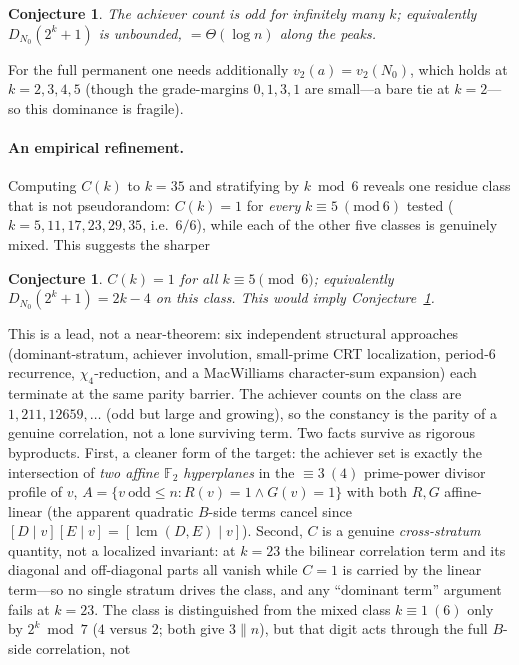 \documentclass[11pt]{article}
\newtheorem{conjecture}[theorem]{Conjecture}
\theoremstyle{remark}\newtheorem{remark}[theorem]{Remark}
\begin{document}
\begin{conjecture}\label{conj:io}
The achiever count is odd for infinitely many $k$; equivalently $D_{N_0}(2^k+1)$ is unbounded,
$=\Theta(\log n)$ along the peaks.
\end{conjecture}
For the full permanent one needs additionally $v_2(a)=v_2(N_0)$, which holds at $k=2,3,4,5$ (though the
grade-margins $0,1,3,1$ are small---a bare tie at $k=2$---so this dominance is fragile).

\paragraph{An empirical refinement.} Computing $C(k)$ to $k=35$ and stratifying by $k\bmod 6$ reveals
one residue class that is not pseudorandom: $C(k)=1$ for \emph{every} $k\equiv5\ (\mathrm{mod}\ 6)$
tested ($k=5,11,17,23,29,35$, i.e.\ $6/6$), while each of the other five classes is genuinely mixed.
This suggests the sharper
\begin{conjecture}\label{conj:mod6}
$C(k)=1$ for all $k\equiv5\pmod6$; equivalently $D_{N_0}(2^k+1)=2k-4$ on this class. This would imply
Conjecture~\ref{conj:io}.
\end{conjecture}
\noindent This is a lead, not a near-theorem: six independent structural approaches (dominant-stratum, achiever involution, small-prime CRT localization,
period-$6$ recurrence, $\chi_4$-reduction, and a MacWilliams \cite{MS} character-sum expansion) each terminate at the same parity barrier.
The achiever counts on the class are $1,211,12659,\dots$ (odd but large and growing), so the
constancy is the parity of a genuine correlation, not a lone surviving term. Two facts survive as
rigorous byproducts. First, a cleaner form of the target: the achiever set is exactly the
intersection of \emph{two affine $\mathbb F_2$ hyperplanes} in the $\equiv3\ (4)$ prime-power divisor
profile of $v$, $A=\{v\ \mathrm{odd}\le n:R(v)=1\wedge G(v)=1\}$ with both $R,G$ affine-linear (the
apparent quadratic $B$-side terms cancel since $[D\mid v][E\mid v]=[\operatorname{lcm}(D,E)\mid v]$).
Second, $C$ is a genuine \emph{cross-stratum} quantity, not a localized invariant: at $k=23$ the
bilinear correlation term and its diagonal and off-diagonal parts all vanish while $C=1$ is carried
by the linear term---so no single stratum drives the class, and any ``dominant term'' argument fails
at $k=23$. The class is distinguished from the mixed class $k\equiv1\ (6)$ only by $2^k\bmod7$ ($4$
versus $2$; both give $3\parallel n$), but that digit acts through the full $B$-side correlation, not
\end{document}

